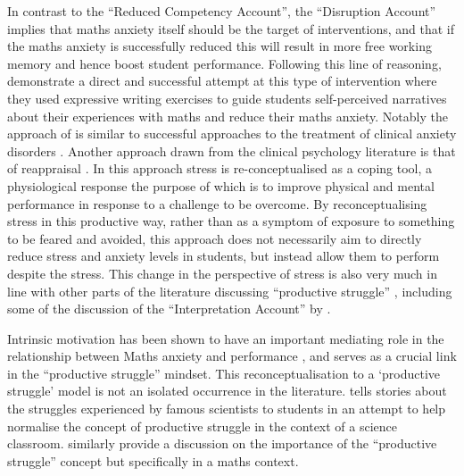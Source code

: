 \documentclass[twoside,12pt,a4paper]{report}
\begin{document}
In contrast to the ``Reduced Competency Account'', the ``Disruption Account'' implies that maths anxiety itself should be the target of interventions, and that if the maths anxiety is successfully reduced this will result in more free working memory and hence boost student performance. Following this line of reasoning,  demonstrate a direct and successful attempt at this type of intervention where they used expressive writing exercises to guide students self-perceived narratives about their experiences with maths and reduce their maths anxiety. Notably the approach of  is similar to successful approaches to the treatment of clinical anxiety disorders \cite{McNally2007, Becker2007,Foa2005}. Another approach drawn from the clinical psychology literature is that of reappraisal \cite{Jamieson2016}. In this approach stress is re-conceptualised as a coping tool, a physiological response the purpose of which is to improve physical and mental performance in response to a challenge to be overcome. By reconceptualising stress in this productive way, rather than as a symptom of exposure to something to be feared and avoided, this approach does not necessarily aim to directly reduce stress and anxiety levels in students, but instead allow them to perform despite the stress. This change in the perspective of stress is also very much in line with other parts of the literature discussing ``productive struggle'' \cite{Wang2015}, including some of the discussion of the ``Interpretation Account'' by .

Intrinsic motivation has been shown to have an important mediating role in the relationship between Maths anxiety and performance \cite{Wang2015}, and serves as a crucial link in the ``productive struggle'' mindset. This reconceptualisation to a `productive struggle' model is not an isolated occurrence in the literature.  tells stories about the struggles experienced by famous scientists to students in an attempt to help normalise the concept of productive struggle in the context of a science classroom.  similarly provide a discussion on the importance of the ``productive struggle'' concept but specifically in a maths context.
\end{document}
